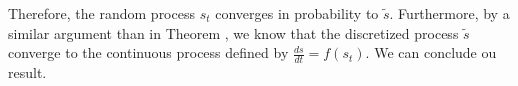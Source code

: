 Therefore, the random process $s_t$ converges in probability to $\tilde s$. Furthermore, by a similar argument than in Theorem , we know that the discretized process $\tilde s$ converge to the continuous process defined by $\frac{ds}{dt} = f(s_t)$. We can conclude ou result.


